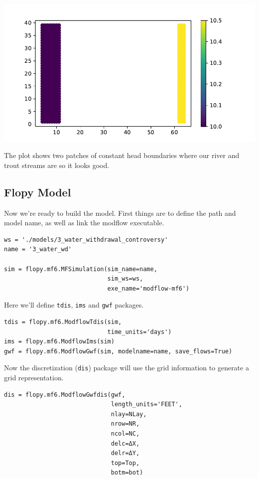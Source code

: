 \documentclass[titlepage,12pt]{unisubmission}
\begin{document}
\begin{center}
\includegraphics[width=.9\linewidth]{./images/3_chd.pdf}
\end{center}

The plot shows two patches of constant head boundaries where our river and trout streams are so it looks good.


\subsection{Flopy Model}
\label{sec:org2310dfb}

Now we're ready to build the model. First things are to define the path and model name, as well as link the modflow executable.

\begin{verbatim}
ws = './models/3_water_withdrawal_controversy'
name = '3_water_wd'

sim = flopy.mf6.MFSimulation(sim_name=name,
                             sim_ws=ws,
                             exe_name='modflow-mf6')
\end{verbatim}

Here we'll define \texttt{tdis}, \texttt{ims} and \texttt{gwf} packages.

\begin{verbatim}
tdis = flopy.mf6.ModflowTdis(sim,
                             time_units='days')
ims = flopy.mf6.ModflowIms(sim)
gwf = flopy.mf6.ModflowGwf(sim, modelname=name, save_flows=True)
\end{verbatim}

Now the discretization (\texttt{dis}) package will use the grid information to generate a grid representation.

\begin{verbatim}
dis = flopy.mf6.ModflowGwfdis(gwf,
                              length_units='FEET',
                              nlay=NLay,
                              nrow=NR,
                              ncol=NC,
                              delc=ΔX,
                              delr=ΔY,
                              top=Top,
                              botm=bot)
\end{verbatim}
\end{document}
